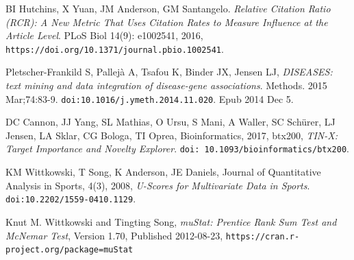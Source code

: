 \documentclass[12pt]{extarticle}
\begin{document}
\begin{thebibliography}{3}
BI Hutchins, X Yuan, JM Anderson, GM Santangelo. 
\textit{Relative Citation Ratio (RCR): A New Metric That Uses Citation Rates to Measure Influence at the Article Level}. 
PLoS Biol 14(9): e1002541, 2016, \texttt{https://doi.org/10.1371/journal.pbio.1002541}.

Pletscher-Frankild S, Pallejà A, Tsafou K, Binder JX, Jensen LJ,
\textit{DISEASES: text mining and data integration of disease-gene associations}.
Methods. 2015 Mar;74:83-9. 
\texttt{doi:10.1016/j.ymeth.2014.11.020}.
Epub 2014 Dec 5.

DC Cannon, JJ Yang, SL Mathias, O Ursu, S Mani, A Waller, SC Schürer, LJ Jensen, LA Sklar, CG Bologa, TI Oprea, Bioinformatics, 2017, btx200, 
\textit{TIN-X: Target Importance and Novelty Explorer}. 
\texttt{doi: 10.1093/bioinformatics/btx200}.

KM Wittkowski, T Song, K Anderson, JE Daniels,
Journal of Quantitative Analysis in Sports, 4(3), 2008,
\textit{U-Scores for Multivariate Data in Sports}.
\texttt{doi:10.2202/1559-0410.1129}.

Knut M. Wittkowski and Tingting Song,
\textit{muStat: Prentice Rank Sum Test and McNemar Test}, Version 1.70, Published 2012-08-23,
\texttt{https://cran.r-project.org/package=muStat}

\end{thebibliography}
\end{document}
